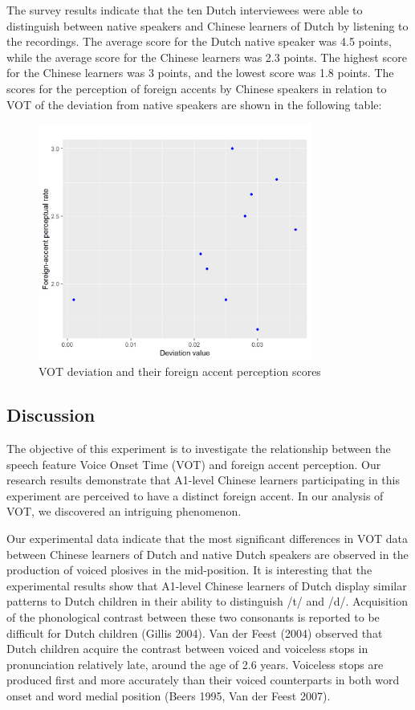 \documentclass[runningheads]{llncs}
\begin{document}
The survey results indicate that the ten Dutch interviewees were able to distinguish between native speakers and Chinese learners of Dutch by listening to the recordings. The average score for the Dutch native speaker was 4.5 points, while the average score for the Chinese learners was 2.3 points. The highest score for the Chinese learners was 3 points, and the lowest score was 1.8 points. \cite{van_sluis_acoustic_nodate}
The scores for the perception of foreign accents by Chinese speakers in relation to VOT of the deviation from native speakers are shown in the following table:
\begin{figure}
    \centering
    \includegraphics[width=0.8\textwidth]{Figure2.jpg}
    \caption{VOT deviation and their foreign accent perception scores}
\end{figure}

\subsection*{Discussion}
The objective of this experiment is to investigate the relationship between the speech feature Voice Onset Time (VOT) and foreign accent perception. Our research results demonstrate that A1-level Chinese learners participating in this experiment are perceived to have a distinct foreign accent. In our analysis of VOT, we discovered an intriguing phenomenon.

Our experimental data indicate that the most significant differences in VOT data between Chinese learners of Dutch and native Dutch speakers are observed in the production of voiced plosives in the mid-position. It is interesting that the experimental results show that A1-level Chinese learners of Dutch display similar patterns to Dutch children in their ability to distinguish /t/ and /d/. Acquisition of the phonological contrast between these two consonants is reported to be difficult for Dutch children (Gillis 2004). Van der Feest (2004) observed that Dutch children acquire the contrast between voiced and voiceless stops in pronunciation relatively late, around the age of 2.6 years. Voiceless stops are produced first and more accurately than their voiced counterparts in both word onset and word medial position (Beers 1995, Van der Feest 2007). \cite{hanssen_t-bias_2015}
\end{document}
